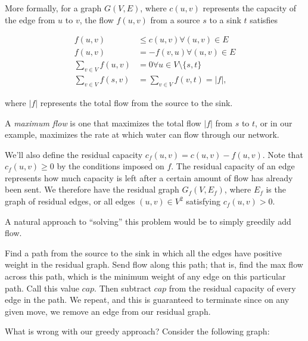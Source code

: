 More formally, for a graph $G(V,E)$, where $c(u,v)$ represents the capacity of the edge from $u$ to $v$, the flow $f(u,v)$ from a source $s$ to a sink $t$ satisfies

\begin{align*}
f(u,v) &\le c(u,v) \forall (u,v) \in E \\
f(u,v) &= -f(v,u) \forall (u,v) \in E \\
\sum_{v \in V} f(u,v) &= 0 \forall u \in V \setminus \{s,t\} \\
\sum_{v \in V} f(s,v) &= \sum_{v \in V} f(v,t) = |f|,
\end{align*}

where $|f|$ represents the total flow from the source to the sink.

A \textit{maximum flow} is one that maximizes the total flow $|f|$ from $s$ to $t$, or in our example, maximizes the rate at which water can flow through our network.

We'll also define the residual capacity $c_f(u,v) = c(u,v) - f(u,v)$. Note that $c_f(u,v) \ge 0$ by the conditions imposed on $f$. The residual capacity of an edge represents how much capacity is left after a certain amount of flow has already been sent. We therefore have the residual graph $G_f(V,E_f)$, where $E_f$ is the graph of residual edges, or all edges $(u,v) \in V^2$ satisfying $c_f(u,v) > 0$.

A natural approach to ``solving'' this problem would be to simply greedily add flow.

Find a path from the source to the sink in which all the edges have positive weight in the residual graph. Send flow along this path; that is, find the max flow across this path, which is the minimum weight of any edge on this particular path. Call this value $cap$. Then subtract $cap$ from the residual capacity of every edge in the path. We repeat, and this is guaranteed to terminate since on any given move, we remove an edge from our residual graph.

What is wrong with our greedy approach? Consider the following graph:

\begin{center}
\end{center}

